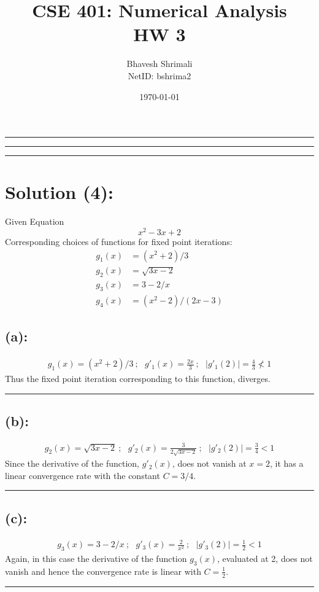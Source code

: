 
\title{\bf CSE 401: Numerical Analysis \\ HW 3}
\author{Bhavesh Shrimali \\ NetID: bshrima2}
\date{\today}
\titlespacing*{\title}{-2ex}{*-2ex}{-2ex}

\maketitle \hrule \hrule \hrule
\section*{Solution (4): }
Given Equation
\[
x^2-3x+2
\]
Corresponding choices of functions for fixed point iterations: 
\begin{align*}
g_1(x) & = (x^2+2)/3 \\
g_2(x) & = \sqrt{3x-2}\\
g_3(x) & = 3-2/x\\
g_4(x) & = (x^2-2)/(2x-3)
\end{align*}
\subsection*{(a):}
\begin{align*}
g_1(x) 
=
(x^2+2)/3\ ; \ \ \ g'_1(x) = \frac{2x}{3}\ ; \ \ \ |g'_1(2)| = \frac{4}{3} \nless 1
\end{align*}
Thus the fixed point iteration corresponding to this function, diverges. \\ \hrule
\subsection*{(b):}
\begin{align*}
g_2(x) 
=
\sqrt{3x-2}\ ; \ \ \ g'_2(x) = \frac{3}{2\sqrt{3x-2}}\ ; \ \ \ |g'_2(2)| = \frac{3}{4} < 1
\end{align*}
Since the derivative of the function, $g'_2(x)$, does not vanish at $x=2$, it has a linear convergence rate with the constant $C=3/4$. \\ \hrule
\subsection*{(c): }
\begin{align*}
g_3(x)
=
3-2/x\ ; \ \ \ g'_3(x) = \frac{2}{x^2}\ ; \ \ \ |g'_3(2)| = \frac{1}{2} < 1
\end{align*}
Again, in this case the derivative of the function $g_3(x)$, evaluated at 2, does not vanish and hence the convergence rate is linear with $C=\frac{1}{2}$. \\ \hrule
